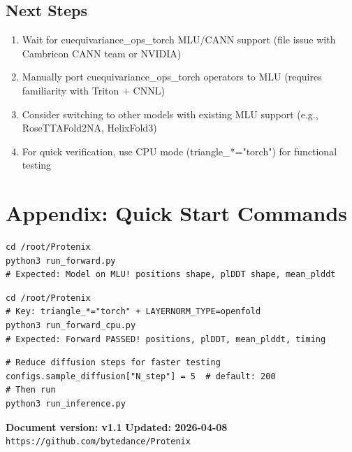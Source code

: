 \documentclass[12pt,a4paper]{article}
\begin{document}
\subsection{Next Steps}

\begin{enumerate}
    \item Wait for cuequivariance_ops_torch MLU/CANN support (file issue with Cambricon CANN team or NVIDIA)
    \item Manually port cuequivariance_ops_torch operators to MLU (requires familiarity with Triton + CNNL)
    \item Consider switching to other models with existing MLU support (e.g., RoseTTAFold2NA, HelixFold3)
    \item For quick verification, use CPU mode (triangle_*="torch") for functional testing
\end{enumerate}

\appendix
\section{Appendix: Quick Start Commands}

\begin{verbatim}
cd /root/Protenix
python3 run_forward.py
# Expected: Model on MLU! positions shape, plDDT shape, mean_plddt
\end{verbatim}

\begin{verbatim}
cd /root/Protenix
# Key: triangle_*="torch" + LAYERNORM_TYPE=openfold
python3 run_forward_cpu.py
# Expected: Forward PASSED! positions, plDDT, mean_plddt, timing
\end{verbatim}

\begin{verbatim}
# Reduce diffusion steps for faster testing
configs.sample_diffusion["N_step"] = 5  # default: 200
# Then run
python3 run_inference.py
\end{verbatim}

\vfill
\begin{center}
    \textbf{Document version: v1.1} \quad \textbf{Updated: 2026-04-08} \\
    \texttt{https://github.com/bytedance/Protenix}
\end{center}
\end{document}

